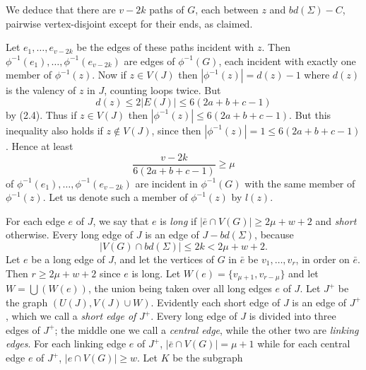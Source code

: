 We deduce that there are $v - 2k$ paths of $G$, each between $z$ and $bd(\Sigma) - C$, pairwise vertex-disjoint except for their ends, as claimed.

Let $e_1, \dots, e_{v - 2k}$ be the edges of these paths incident with $z$. Then $\phi^{-1}(e_1), \dots, \phi^{-1}(e_{v - 2k})$ are edges of $\phi^{-1}(G)$, each incident with exactly one member of $\phi^{-1}(z)$. Now if $z \in V(J)$ then $|\phi^{-1}(z)| = d(z) - 1$ where $d(z)$ is the valency of $z$ in $J$, counting loops twice. But
\begin{equation*}
d(z) \le 2|E(J)| \le 6(2a + b + c - 1)
\end{equation*}
by (2.4). Thus if $z \in V(J)$ then $|\phi^{-1}(z)| \le 6(2a + b + c - 1)$. But this inequality also holds if $z \notin V(J)$, since then $|\phi^{-1}(z)| = 1 \le 6(2a + b + c - 1)$. Hence at least
\begin{equation*}
\frac{v - 2k}{6(2a + b + c - 1)} \ge \mu
\end{equation*}
of $\phi^{-1}(e_1), \dots, \phi^{-1}(e_{v - 2k})$ are incident in $\phi^{-1}(G)$ with the same member of $\phi^{-1}(z)$. Let us denote such a member of $\phi^{-1}(z)$ by $l(z)$.

For each edge $e$ of $J$, we say that $e$ is \textit{long} if $|\bar{e} \cap V(G)| \ge 2\mu + w + 2$ and \textit{short} otherwise. Every long edge of $J$ is an edge of $J - bd(\Sigma)$, because
\begin{equation*}
|V(G) \cap bd(\Sigma)| \le 2k < 2\mu + w + 2.
\end{equation*}
Let $e$ be a long edge of $J$, and let the vertices of $G$ in $\bar{e}$ be $v_1, \dots, v_r$, in order on $\bar{e}$. Then $r \ge 2\mu + w + 2$ since $e$ is long. Let $W(e) = \{v_{\mu + 1}, v_{r - \mu}\}$ and let $W = \bigcup (W(e))$, the union being taken over all long edges $e$ of $J$. Let $J^+$ be the graph $(U(J), V(J) \cup W)$. Evidently each short edge of $J$ is an edge of $J^+$, which we call a \textit{short edge of} $J^+$. Every long edge of $J$ is divided into three edges of $J^+$; the middle one we call a \textit{central edge}, while the other two are \textit{linking edges}. For each linking edge $e$ of $J^+$, $|\bar{e} \cap V(G)| = \mu + 1$ while for each central edge $e$ of $J^+$, $|e \cap V(G)| \ge w$. Let $K$ be the subgraph
